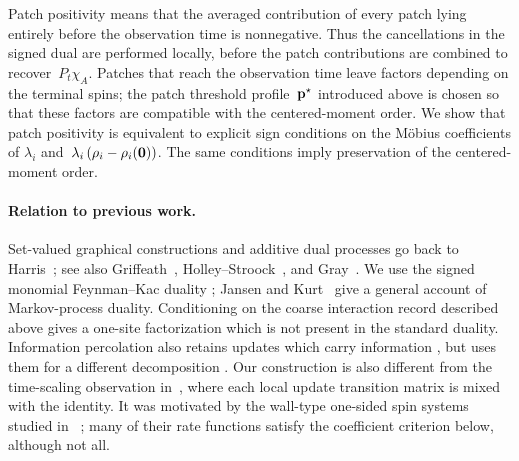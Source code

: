 %
%

Patch positivity means that the averaged contribution of every patch lying
entirely before the observation time is nonnegative. Thus the cancellations in
the signed dual are performed locally, before the patch contributions are
combined to recover~$P_t\chi_A$. Patches that reach the observation time leave
factors depending on the terminal spins; the patch threshold
profile~$\mathbf{p}^\star$ introduced above is chosen so that these factors are
compatible with the centered-moment order. We show that patch positivity is
equivalent to explicit sign conditions on the M\"obius coefficients of
$\lambda_i$ and~$\lambda_i\left(\rho_i-\rho_i(\mathbf{0})\right)$. The same conditions
imply preservation of the centered-moment order.

\paragraph{Relation to previous work.}
 Set-valued graphical constructions and additive dual processes go back to
Harris~\cite{Harris1974,Harris1978}; see also
Griffeath~\cite{Griffeath1979}, Holley--Stroock~\cite{HolleyStroock1979}, and
Gray~\cite{Gray1986}. We use the signed monomial Feynman--Kac duality ; Jansen
and Kurt~\cite{JansenKurt2014} give a general account of Markov-process
duality. Conditioning on the coarse interaction record  described above gives a
one-site factorization which is not present in the standard duality.
Information percolation also retains updates which carry information
\cite{LubetzkySly2016}, but uses them for a different decomposition . Our
construction is also different from the time-scaling observation
in~\cite{GluchowskiMenz2025}, where each local update transition matrix is mixed
with the identity. It was motivated by the wall-type one-sided spin systems
studied in~\cite{GluchowskiMenz2026} ; many of their rate functions satisfy the
coefficient criterion below, although not all.

